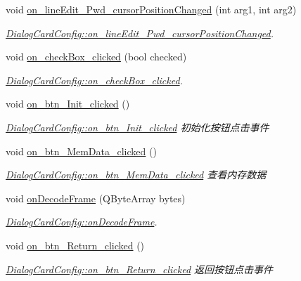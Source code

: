 \begin{DoxyCompactItemize}
\item 
void \mbox{\hyperlink{class_dialog_card_config_a9f395a60ba0f64df7eb1543c2750c868}{on\+\_\+line\+Edit\+\_\+\+Pwd\+\_\+cursor\+Position\+Changed}} (int arg1, int arg2)
\begin{DoxyCompactList}\small\item\em \mbox{\hyperlink{class_dialog_card_config_a9f395a60ba0f64df7eb1543c2750c868}{Dialog\+Card\+Config\+::on\+\_\+line\+Edit\+\_\+\+Pwd\+\_\+cursor\+Position\+Changed}}. \end{DoxyCompactList}\item 
void \mbox{\hyperlink{class_dialog_card_config_a50d4d52916bb20bc93ceb0a9d515b0ca}{on\+\_\+check\+Box\+\_\+clicked}} (bool checked)
\begin{DoxyCompactList}\small\item\em \mbox{\hyperlink{class_dialog_card_config_a50d4d52916bb20bc93ceb0a9d515b0ca}{Dialog\+Card\+Config\+::on\+\_\+check\+Box\+\_\+clicked}}. \end{DoxyCompactList}\item 
void \mbox{\hyperlink{class_dialog_card_config_a50f8d5a8eab6386e03a86094ae5098b7}{on\+\_\+btn\+\_\+\+Init\+\_\+clicked}} ()
\begin{DoxyCompactList}\small\item\em \mbox{\hyperlink{class_dialog_card_config_a50f8d5a8eab6386e03a86094ae5098b7}{Dialog\+Card\+Config\+::on\+\_\+btn\+\_\+\+Init\+\_\+clicked}} 初始化按钮点击事件 \end{DoxyCompactList}\item 
void \mbox{\hyperlink{class_dialog_card_config_a1959f4e04b85a8366ca705e31a4db85c}{on\+\_\+btn\+\_\+\+Mem\+Data\+\_\+clicked}} ()
\begin{DoxyCompactList}\small\item\em \mbox{\hyperlink{class_dialog_card_config_a1959f4e04b85a8366ca705e31a4db85c}{Dialog\+Card\+Config\+::on\+\_\+btn\+\_\+\+Mem\+Data\+\_\+clicked}} 查看内存数据 \end{DoxyCompactList}\item 
void \mbox{\hyperlink{class_dialog_card_config_aed468b0bda0695d288795c0d8ef32dd8}{on\+Decode\+Frame}} (Q\+Byte\+Array bytes)
\begin{DoxyCompactList}\small\item\em \mbox{\hyperlink{class_dialog_card_config_aed468b0bda0695d288795c0d8ef32dd8}{Dialog\+Card\+Config\+::on\+Decode\+Frame}}. \end{DoxyCompactList}\item 
void \mbox{\hyperlink{class_dialog_card_config_ae96a2ac9d41cac74dee19642e81972fc}{on\+\_\+btn\+\_\+\+Return\+\_\+clicked}} ()
\begin{DoxyCompactList}\small\item\em \mbox{\hyperlink{class_dialog_card_config_ae96a2ac9d41cac74dee19642e81972fc}{Dialog\+Card\+Config\+::on\+\_\+btn\+\_\+\+Return\+\_\+clicked}} 返回按钮点击事件 \end{DoxyCompactList}\end{DoxyCompactItemize}
